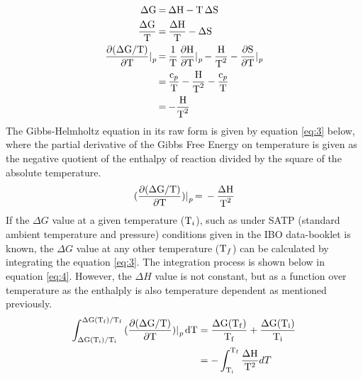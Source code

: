 \documentclass{article}
\begin{document}
\begin{equation}
\begin{split}
\ce{
\Delta G &= \Delta H - T \Delta S \\ 
\frac{\Delta G}{T} &= \frac{\Delta H}{T} - \Delta S \\ 
\frac{\partial (\Delta G/T)}{\partial T}|_p &= \frac{1}{T} \frac{\partial H}{\partial T}|_p - \frac{H}{T^2} - \frac{\partial S}{\partial T}|_p \\ 
&= \frac{c_p}{T} - \frac{H}{T^2} - \frac{c_p}{T} \\ 
&= -\frac{H}{T^2}
}
\end{split}
\end{equation}
The Gibbs-Helmholtz equation in its raw form is given by equation \ref{eq:3} below, where the partial derivative of the Gibbs Free Energy on temperature is given as the negative quotient of the enthalpy of reaction divided by the square of the absolute temperature.
\begin{equation}
\ce{(\frac{\partial(\Delta G/T)}{\partial T})|_p = - \frac{\Delta H}{T^2}} \label{eq:3}
\end{equation}
If the $\Delta G$ value at a given temperature ($\ce{T_i}$), such as under SATP (standard ambient temperature and pressure) conditions given in the IBO data-booklet is known, the $\Delta G$ value at any other temperature ($\ce{T_f}$) can be calculated by integrating the equation \ref{eq:3}. The integration process is shown below in equation \ref{eq:4}. However, the $\Delta H$ value is not constant, but as a function over temperature as the enthalply is also temperature dependent as mentioned previously.
\begin{equation}
\begin{split}
\int_{\Delta \mathrm{G(T_i)/T_i}}^{\mathrm{\Delta G(T_f)/T_f}}{(\frac{\mathrm{\partial (\Delta G/T)}}{\mathrm{\partial T}})|\ce{_p dT}} &= \frac{\mathrm{\Delta G(T_f)}}{\mathrm{T_f}} + \frac{\mathrm{\Delta G(T_i)}}{\mathrm{T_i}} \label{eq:4} \\
&= -\int_{\mathrm{T_i}}^{\mathrm{T_f}} \frac{\mathrm{\Delta H}}{\mathrm{T^2}} dT 
\end{split}
\end{equation}
\end{document}
